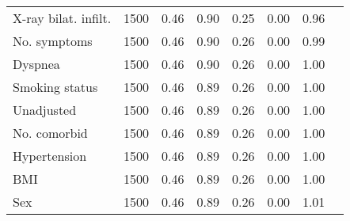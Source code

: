 \documentclass{article}
\begin{document}
{\begin{longtable}{lccccccc}
X-ray bilat. infilt. & 1500 & 0.46 & 0.90 & 0.25 &  0.00 & 0.96 \\ 
No. symptoms & 1500 & 0.46 & 0.90 & 0.26 &  0.00 & 0.99 \\ 
Dyspnea & 1500 & 0.46 & 0.90 & 0.26 &  0.00 & 1.00 \\ 
Smoking status & 1500 & 0.46 & 0.89 & 0.26 &  0.00 & 1.00 \\ 
Unadjusted & 1500 & 0.46 & 0.89 & 0.26 &  0.00 & 1.00 \\ 
No. comorbid & 1500 & 0.46 & 0.89 & 0.26 &  0.00 & 1.00 \\ 
Hypertension & 1500 & 0.46 & 0.89 & 0.26 &  0.00 & 1.00 \\ 
BMI & 1500 & 0.46 & 0.89 & 0.26 &  0.00 & 1.00 \\ 
Sex & 1500 & 0.46 & 0.89 & 0.26 &  0.00 & 1.01 \\
\bottomrule
\hline
\end{longtable}
}

\clearpage
\end{document}
